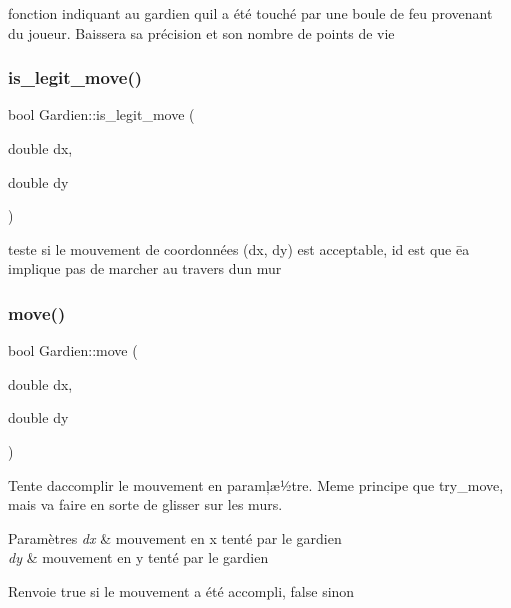fonction indiquant au gardien qu\textquotesingle{}il a été touché par une boule de feu provenant du joueur. Baissera sa précision et son nombre de points de vie 

\mbox{\label{classGardien_aab71ebf5fb9fc0053459bac6bdd0f466}} 
\subsubsection{\texorpdfstring{is\+\_\+legit\+\_\+move()}{is\_legit\_move()}}
{\footnotesize\ttfamily bool Gardien\+::is\+\_\+legit\+\_\+move (\begin{DoxyParamCaption}\item[{double}]{dx,  }\item[{double}]{dy }\end{DoxyParamCaption})\hspace{0.3cm}{\ttfamily [private]}}



teste si le mouvement de coordonnées (dx, dy) est acceptable, id est que ēa implique pas de marcher au travers d\textquotesingle{}un mur 

\mbox{\label{classGardien_a1de6511bda736ad456457c51fa9d8d68}} 
\subsubsection{\texorpdfstring{move()}{move()}}
{\footnotesize\ttfamily bool Gardien\+::move (\begin{DoxyParamCaption}\item[{double}]{dx,  }\item[{double}]{dy }\end{DoxyParamCaption})\hspace{0.3cm}{\ttfamily [virtual]}}



Tente d\textquotesingle{}accomplir le mouvement en paramļæ½tre. Meme principe que try\+\_\+move, mais va faire en sorte de glisser sur les murs. 


\begin{DoxyParams}{Paramètres}
{\em dx} & mouvement en x tenté par le gardien \\
\hline
{\em dy} & mouvement en y tenté par le gardien \\
\hline
\end{DoxyParams}
\begin{DoxyReturn}{Renvoie}
true si le mouvement a été accompli, false sinon 
\end{DoxyReturn}


